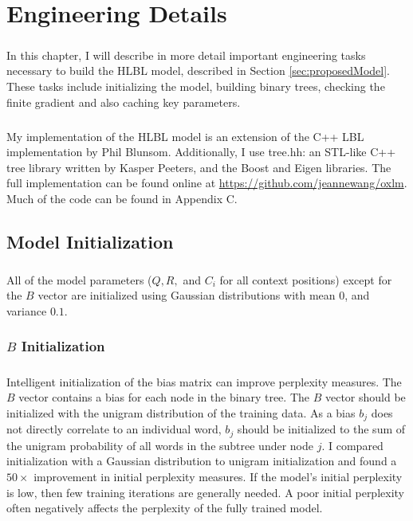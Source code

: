 
\chapter{Engineering Details}
\paragraph{}
In this chapter, I will describe in more detail important engineering tasks necessary to build the HLBL model, described in Section \ref{sec:proposedModel}. These tasks include initializing the model, building binary trees, checking the finite gradient and also caching key parameters.

\paragraph{}
My implementation of the HLBL model is an extension of the C++ LBL implementation by Phil Blunsom. Additionally, I use tree.hh: an STL-like C++ tree library written by Kasper Peeters, and the Boost \cite{BoostSite} and Eigen \cite{eigenweb} libraries. The full implementation can be found online at \url{https://github.com/jeannewang/oxlm}. Much of the code can be found in Appendix C.

\section{Model Initialization}
\paragraph{}
All of the model parameters ($Q,R,$ and $C_i$ for all context positions) except for the $B$ vector are initialized using Gaussian distributions with mean $0$, and variance $0.1$.
\subsection{$B$ Initialization}
\paragraph{}
Intelligent initialization of the bias matrix can improve perplexity measures. The $B$ vector contains a bias for each node in the binary tree.  The $B$ vector should be initialized with the unigram distribution of the training data. As a bias $b_j$ does not directly correlate to an individual word, $b_j$ should be initialized to the sum of the unigram probability of all words in the subtree under node $j$.  I compared initialization with a Gaussian distribution to unigram initialization and found a $50\times$ improvement in initial perplexity measures. If the model's initial perplexity is low, then few training iterations are generally needed. A poor initial perplexity often negatively affects the perplexity of the fully trained model.

